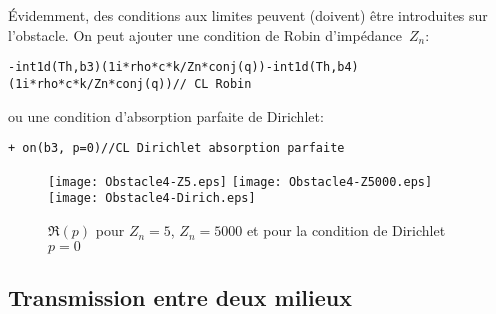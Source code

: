 Évidemment, des conditions aux limites peuvent (doivent) être introduites sur l'obstacle.
On peut ajouter une condition de Robin d'impédance~$Z_n$:
\begin{lstlisting}[firstnumber=34]
-int1d(Th,b3)(1i*rho*c*k/Zn*conj(q))-int1d(Th,b4)(1i*rho*c*k/Zn*conj(q))// CL Robin
\end{lstlisting}
ou une condition d'absorption parfaite de Dirichlet:
\begin{lstlisting}[firstnumber=34]
+ on(b3, p=0)//CL Dirichlet absorption parfaite
\end{lstlisting}
\begin{figure}[h!]
\centering
   \texttt{[image: Obstacle4-Z5.eps]}\hfill
   \texttt{[image: Obstacle4-Z5000.eps]}\hfill
   \texttt{[image: Obstacle4-Dirich.eps]}
\caption{$\Re(p)$ pour $Z_n=5$, $Z_n=5000$ et pour la condition de Dirichlet $p=0$}\label{Fig-Obstacle4}
\end{figure}


\medskip
\subsection{Transmission entre deux milieux}

